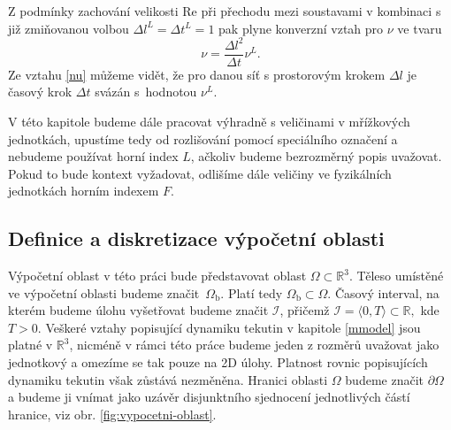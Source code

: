 Z podmínky zachování velikosti $ \mathrm{Re} $ při přechodu mezi soustavami v kombinaci s již zmiňovanou volbou $ \Delta l^{L} = \Delta t^{L} = 1 $ pak plyne konverzní vztah pro $ \nu $ ve tvaru
\begin{equation}\label{nu}
\nu = \dfrac{\Delta l^{2}}{\Delta t} \nu^L.
\end{equation}
Ze vztahu \eqref{nu} můžeme vidět, že pro danou síť s prostorovým krokem $ \Delta l $ je časový krok $ \Delta t $ svázán s~hodnotou $ \nu^L $.


V této kapitole budeme dále pracovat výhradně s veličinami v mřížkových jednotkách, upustíme tedy od rozlišování pomocí speciálního označení a nebudeme používat horní index $ L $, ačkoliv budeme bezrozměrný popis uvažovat. Pokud to bude kontext vyžadovat, odlišíme dále veličiny ve fyzikálních jednotkách horním indexem $ F$.

\subsection{Definice a diskretizace výpočetní oblasti}\label{disk}
Výpočetní oblast v této práci bude představovat oblast $ \Omega  \subset \mathbb{R}^3$. Těleso umístěné ve výpočetní oblasti budeme \mbox{značit $ \Omega_{\mathrm{b}} $.} Platí tedy $ \Omega_{\mathrm{b}} \subset \Omega$. Časový interval, na kterém budeme úlohu vyšetřovat budeme značit $ \mathcal{I} $, přičemž $ \mathcal{I} = \langle 0, T \rangle \subset \mathbb{R},$ kde $ T > 0$. Veškeré vztahy popisující dynamiku tekutin v kapitole \ref{mmodel} jsou platné v $ \mathbb{R}^3 $, nicméně v rámci této práce budeme jeden z rozměrů uvažovat jako jednotkový a omezíme se tak pouze na 2D úlohy. Platnost rovnic popisujících dynamiku tekutin však zůstává nezměněna. Hranici oblasti $ \Omega $ budeme značit $ \partial \Omega $ a budeme ji vnímat jako uzávěr disjunktního sjednocení jednotlivých částí hranice, viz obr. \ref{fig:vypocetni-oblast}.

